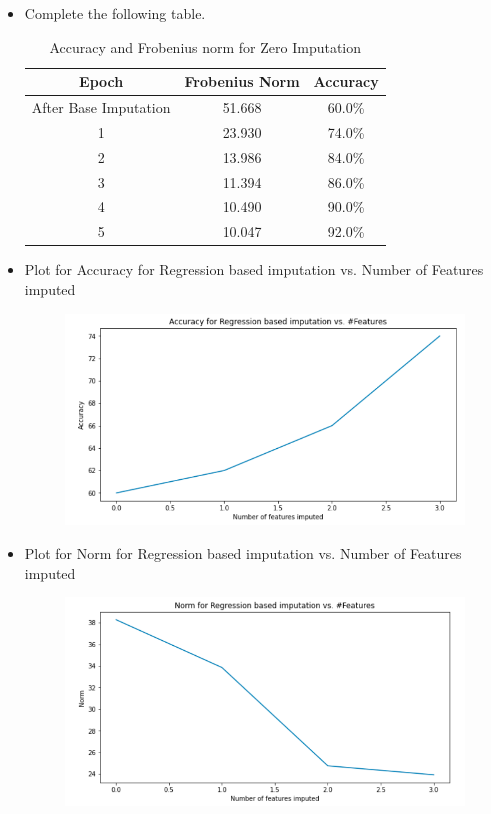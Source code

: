\begin{itemize}
    \item 
Complete the following table.



\begin{table}[H]
\centering
\begin{tabular}{ |c|c|c| } 
 \hline
 \textbf{Epoch} & \textbf{Frobenius Norm} & \textbf{Accuracy} \\
 \hline
 After Base Imputation & 51.668 & 60.0\% \\
 1 & 23.930 & 74.0\% \\
 2 & 13.986 & 84.0\% \\
 3 & 11.394 & 86.0\% \\
 4 & 10.490 & 90.0\% \\
 5 & 10.047 & 92.0\% \\
 \hline
\end{tabular}
\caption{Accuracy and Frobenius norm for Zero Imputation}
\label{nnOA}
\end{table}


\item Plot for Accuracy for Regression based imputation vs. Number of Features imputed\\
    \begin{figure}[H]
    	\centering
    	\includegraphics[width=.7\textwidth]{templates/accuracy_vs_features}
    	\label{fig:my_label}
    \end{figure}

\item Plot for Norm for Regression based imputation vs. Number of Features imputed\\
    \begin{figure}[H]
    	\centering
    	\includegraphics[width=.7\textwidth]{templates/norm_vs_features}
    	\label{fig:my_label}
    \end{figure}


\end{itemize}
